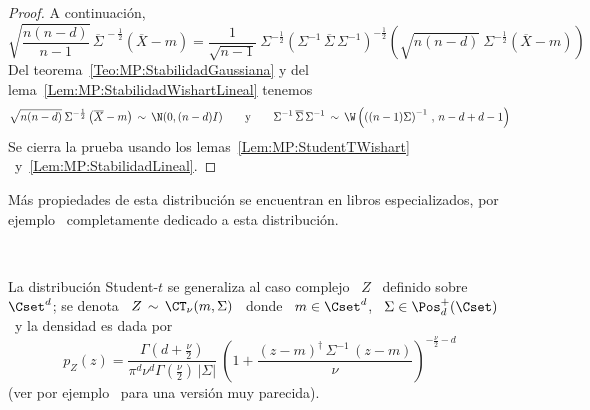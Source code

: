\begin{proof}
  A continuaci\'on,
  \[
  \sqrt{\frac{n   (n-d)}{n-1}}   \,   \overline{\Sigma}^{\,   -\frac12}   \left(
    \overline{X}-m \right)  = \frac{1}{\sqrt{n-1}} \:  \Sigma^{- \frac12} \left(
    \Sigma^{-1}  \, \overline{\Sigma}  \, \Sigma^{-1}  \right)^{-\frac12} \left(
    \sqrt{n (n-d)} \: \Sigma^{-\frac12} \left( \overline{X}-m \right) \right)
  \]
  Del           teorema~\ref{Teo:MP:StabilidadGaussiana}          y          del
  lema~\ref{Lem:MP:StabilidadWishartLineal} tenemos
  \[
  \sqrt{n (n-d)}  \: \Sigma^{-\frac12} \left( \overline{X}-m \right)  \, \sim \,
  \N(0 ,  (n-d) I)  \qquad \mbox{y} \qquad  \Sigma^{-1} \,  \overline{\Sigma} \,
  \Sigma^{-1}  \, \sim  \, \W\left(  \left( (n-1)  \Sigma \right)^{-1}  \,  , \,
    n-d+d-1 \right)
  \]
  Se   cierra   la  prueba   usando   los  lemas~\ref{Lem:MP:StudentTWishart}   \
  y~\ref{Lem:MP:StabilidadLineal}.
\end{proof}



M\'as propiedades de esta distribuci\'on se encuentran en libros especializados,
por ejemplo~\cite{KotNad04} completamente dedicado a esta distribuci\'on.

\

La distribuci\'on  Student-$t$ se generaliza al  caso complejo \  $Z$ \ definido
sobre $\Cset^d$; se denota  \ $Z \, \sim \, \CT_\nu(m,\Sigma)$ \  donde \ $m \in
\Cset^d$, \ $\Sigma \in \Pos_d^+(\Cset)$ \ y la densidad es dada por \
%
\[
p_Z(z) = \frac{\Gamma\left( d  + \frac{\nu}{2} \right)}{\pi^d \nu^d \Gamma\left(
    \frac{\nu}{2}   \right)  \,   \left|   \Sigma  \right|}   \:   \left(  1   +
  \frac{(z-m)^\dag \, \Sigma^{-1} \, (z-m)}{\nu} \right)^{- \frac{\nu}{2}-d}
\]
%
(ver  por  ejemplo~\cite[\S~5.12  y   ref.]{KotNad04}  para  una  versi\'on  muy
parecida).

\

